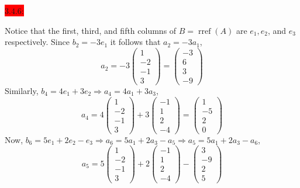\documentclass{exam}
\begin{document}
  \colorbox{red}{\underline{$3.4.6$}:}
  \begin{solution}
    Notice that the first, third, and fifth columns of $B = \operatorname{rref}(A)$ are $e_1, e_2$, and $e_3$ respectively. Since $b_2 = -3e_1$ it follows that $a_2 = -3a_1$, 
    \[
      a_2 = -3\begin{pmatrix}
        1 \\ -2 \\ -1 \\ 3
      \end{pmatrix} = \begin{pmatrix}
        -3 \\ 6 \\ 3 \\ -9
      \end{pmatrix}
    \]
    Similarly, $b_4 = 4e_1 + 3e_2 \Rightarrow a_4 = 4a_1 + 3a_3$, 
    \[
      a_4 = 4\begin{pmatrix}
        1 \\ -2 \\ -1 \\ 3
      \end{pmatrix}
      + 3\begin{pmatrix}
        -1 \\ 1 \\ 2 \\ -4
      \end{pmatrix}
      = \begin{pmatrix}
        1 \\ -5 \\ 2 \\ 0
      \end{pmatrix}
    \]
    Now, $b_6 = 5e_1 + 2e_2 - e_3 \Rightarrow a_6 = 5a_1 + 2a_3 - a_5 \Rightarrow a_5 = 5a_1 + 2a_3 - a_6$, 
    \[
      a_5 = 5\begin{pmatrix}
        1 \\ -2 \\ -1 \\ 3
      \end{pmatrix}
      + 2\begin{pmatrix}
        -1 \\ 1 \\ 2 \\ -4
      \end{pmatrix}
      -\begin{pmatrix}
        3 \\ -9 \\ 2 \\ 5

\end{pmatrix}\]
\end{solution}
\end{document}
